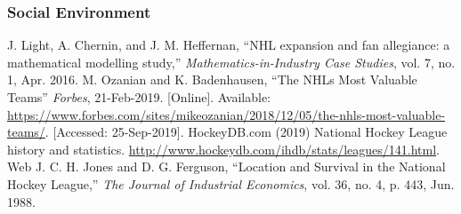 \documentclass[11pt]{report}            %
\begin{document}
\subsubsection*{Social Environment}



\begin{thebibliography}{9}
 J. Light, A. Chernin, and J. M. Heffernan, ``NHL expansion and fan allegiance: a mathematical modelling study,” \textit{Mathematics-in-Industry Case Studies}, vol. 7, no. 1, Apr. 2016.
 M. Ozanian and K. Badenhausen, ``The NHLs Most Valuable Teams” \textit{Forbes}, 21-Feb-2019. [Online]. Available: \url{https://www.forbes.com/sites/mikeozanian/2018/12/05/the-nhls-most-valuable-teams/}. [Accessed: 25-Sep-2019].
  HockeyDB.com (2019) National Hockey League history and statistics. \url{http://www.hockeydb.com/ihdb/stats/leagues/141.html}. Web
J. C. H. Jones and D. G. Ferguson, ``Location and Survival in the National Hockey League,” \textit{The Journal of Industrial Economics}, vol. 36, no. 4, p. 443, Jun. 1988.
\end{thebibliography}
\end{document}
